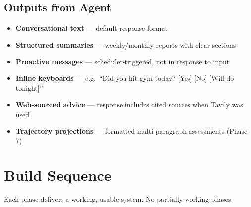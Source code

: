 \documentclass[12pt, a4paper]{article}
\begin{document}
\subsection{Outputs from Agent}

\begin{itemize}[noitemsep]
    \item \textbf{Conversational text} --- default response format
    \item \textbf{Structured summaries} --- weekly/monthly reports with clear sections
    \item \textbf{Proactive messages} --- scheduler-triggered, not in response to input
    \item \textbf{Inline keyboards} --- e.g.\ ``Did you hit gym today? [Yes] [No] [Will do tonight]''
    \item \textbf{Web-sourced advice} --- response includes cited sources when Tavily was used
    \item \textbf{Trajectory projections} --- formatted multi-paragraph assessments (Phase 7)
\end{itemize}

\section{Build Sequence}

Each phase delivers a working, usable system. No partially-working phases.
\end{document}

